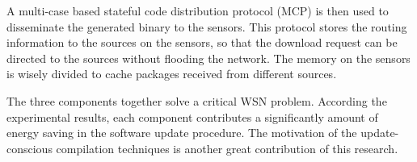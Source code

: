 A multi-case based stateful code distribution protocol (MCP) is then used to disseminate the generated binary to the 
sensors. This protocol stores the routing information to the sources on the sensors, so that the download request can 
be directed to the sources without flooding the network.
The memory on the sensors is wisely divided to cache packages received from different sources. 

The three components together solve a critical WSN problem. According the experimental results, each component 
contributes a significantly amount of energy saving in the software update procedure. The motivation of the 
update-conscious compilation techniques is another great contribution of this research.

